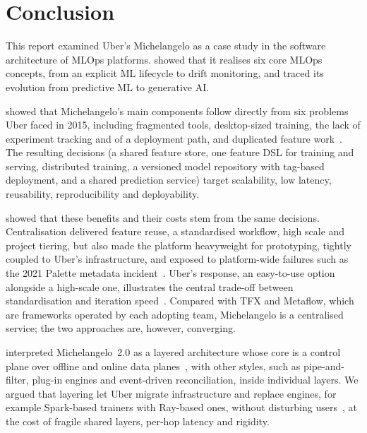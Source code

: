 ﻿%

\section{Conclusion}
\label{sec:conclusion}

This report examined Uber's Michelangelo as a case study in the software
architecture of MLOps platforms.  showed that it
realises six core MLOps concepts, from an explicit ML lifecycle to
drift monitoring, and  traced its
evolution from predictive ML to generative AI.

 showed that Michelangelo's main components
follow directly from six problems Uber faced in 2015, including fragmented
tools, desktop-sized training, the lack of experiment tracking and of a
deployment path, and duplicated feature work~\cite{delbalso2017meet}. The
resulting decisions (a shared feature store, one feature DSL for training
and serving, distributed training, a versioned model repository with
tag-based deployment, and a shared prediction service) target
scalability, low latency, reusability, reproducibility and deployability.

 showed that these benefits and their costs stem from
the same decisions. Centralisation delivered feature reuse, a
standardised workflow, high scale and project tiering, but also made the
platform heavyweight for prototyping, tightly coupled to Uber's
infrastructure, and exposed to platform-wide failures such as the 2021
Palette metadata incident~\cite{uber2024palette}.
Uber's response, an easy-to-use option alongside a high-scale one,
illustrates the central trade-off between standardisation and iteration
speed~\cite{delbalso2018scaling}. Compared with TFX and Metaflow, which
are frameworks operated by each adopting team, Michelangelo is a
centralised service; the two approaches are, however, converging.

 interpreted Michelangelo~2.0 as a layered
architecture whose core is a control plane over offline and online data
planes~\cite{wang2024predictive}, with other styles, such as
pipe-and-filter, plug-in engines and event-driven reconciliation, inside
individual layers. We argued that layering let Uber migrate infrastructure and replace
engines, for example Spark-based trainers with Ray-based ones, without
disturbing users~\cite{wang2024predictive}, at the cost of fragile shared
layers, per-hop latency and rigidity.

